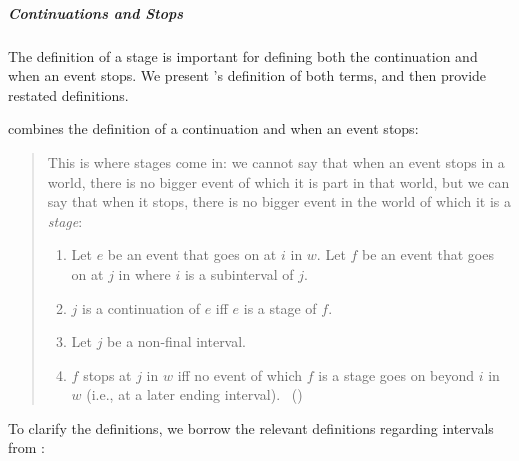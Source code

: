 \subparagraph{Continuations and Stops}

\begin{note}
  The definition of a stage is important for defining both the continuation and when an event stops.
  We present \citeauthor{Landman:1992wh}'s definition of both terms, and then provide restated definitions.
\end{note}

\begin{note}
  \citeauthor{Landman:1992wh} combines the definition of a continuation and when an event stops:
  \begin{quote}
    This is where stages come in: we cannot say that when an event stops in a world, there is no bigger event of which it is part in that world, but we can say that when it stops, there is no bigger event in the world of which it is a \emph{stage}:
    \begin{enumerate}[label=, noitemsep]
    \item
      Let \(e\) be an event that goes on at \(i\) in \(w\).
      Let \(f\) be an event that goes on at \(j\) in where \(i\) is a subinterval of \(j\).
    \item
      \(j\) is a continuation of \(e\) iff \(e\) is a stage of \(f\).
    \item
      Let \(j\) be a non-final interval.
    \item
      \(f\) stops at \(j\) in \(w\) iff no event of which \(f\) is a stage goes on beyond \(i\) in \(w\) (i.e., at a later ending interval).\newline
      \mbox{ }\hfill\mbox{(\citeyear[23--24]{Landman:1992wh})}
    \end{enumerate}
  \end{quote}

  To clarify the definitions, we borrow the relevant definitions regarding intervals from \textcite{Dowty:1979vq}:


\end{note}
